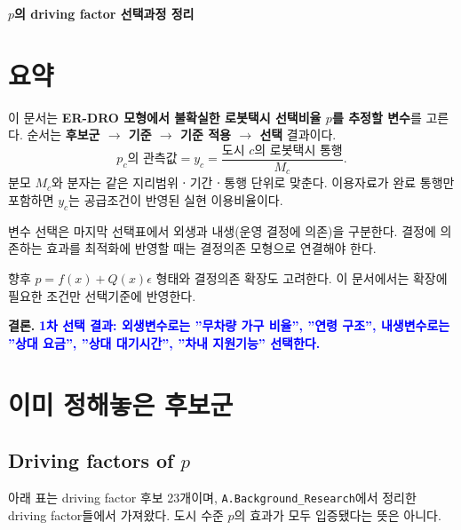 \documentclass[10pt,a4paper]{article}
\begin{document}
\begin{center}
{\Large\bfseries $p$의 driving factor 선택과정 정리}
\end{center}

\section{요약}
이 문서는 \textbf{ER-DRO 모형에서 불확실한 로봇택시 선택비율 $p$를 추정할 변수}를 고른다. 순서는 \textbf{후보군 $\rightarrow$ 기준 $\rightarrow$ 기준 적용 $\rightarrow$ 선택} 결과이다. 
\[
 p_c\text{의 관측값} =y_c=\frac{\text{도시 }c\text{의 로봇택시 통행}}{M_c}.
\]
분모 $M_c$와 분자는 같은 지리범위ㆍ기간ㆍ통행 단위로 맞춘다. 이용자료가 완료 통행만 포함하면 $y_c$는 공급조건이 반영된 실현 이용비율이다.

변수 선택은 마지막 선택표에서 외생과 내생(운영 결정에 의존)을 구분한다. 결정에 의존하는 효과를 최적화에 반영할 때는 결정의존 모형으로 연결해야 한다.

향후 $p=f(x)+Q(x)\epsilon$ 형태와 결정의존 확장도 고려한다. 이 문서에서는 확장에 필요한 조건만 선택기준에 반영한다.

\textbf{결론.} \textcolor{blue}{\textbf{1차 선택 결과: 외생변수로는 ''무차량 가구 비율'', ''연령 구조'', 내생변수로는 ''상대 요금'', ''상대 대기시간'', ''차내 지원기능'' 선택한다.}}

\section{이미 정해놓은 후보군}
\subsection{Driving factors of $p$}
아래 표는 driving factor 후보 23개이며, \texttt{A.Background\_Research}에서 정리한 driving factor들에서 가져왔다. 도시 수준 $p$의 효과가 모두 입증됐다는 뜻은 아니다.
\end{document}
